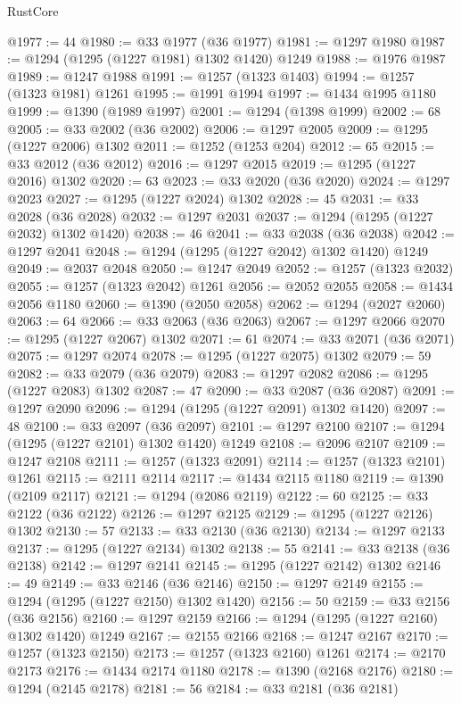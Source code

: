 \begin{lexlean}{RustCore}
\begin{coremodule}
@1977 := 44
@1980 := @33 @1977 (@36 @1977)
@1981 := @1297 @1980
@1987 := @1294 (@1295 (@1227 @1981) @1302 @1420) @1249
@1988 := @1976 @1987
@1989 := @1247 @1988
@1991 := @1257 (@1323 @1403)
@1994 := @1257 (@1323 @1981) @1261
@1995 := @1991 @1994
@1997 := @1434 @1995 @1180
@1999 := @1390 (@1989 @1997)
@2001 := @1294 (@1398 @1999)
@2002 := 68
@2005 := @33 @2002 (@36 @2002)
@2006 := @1297 @2005
@2009 := @1295 (@1227 @2006) @1302
@2011 := @1252 (@1253 @204)
@2012 := 65
@2015 := @33 @2012 (@36 @2012)
@2016 := @1297 @2015
@2019 := @1295 (@1227 @2016) @1302
@2020 := 63
@2023 := @33 @2020 (@36 @2020)
@2024 := @1297 @2023
@2027 := @1295 (@1227 @2024) @1302
@2028 := 45
@2031 := @33 @2028 (@36 @2028)
@2032 := @1297 @2031
@2037 := @1294 (@1295 (@1227 @2032) @1302 @1420)
@2038 := 46
@2041 := @33 @2038 (@36 @2038)
@2042 := @1297 @2041
@2048 := @1294 (@1295 (@1227 @2042) @1302 @1420) @1249
@2049 := @2037 @2048
@2050 := @1247 @2049
@2052 := @1257 (@1323 @2032)
@2055 := @1257 (@1323 @2042) @1261
@2056 := @2052 @2055
@2058 := @1434 @2056 @1180
@2060 := @1390 (@2050 @2058)
@2062 := @1294 (@2027 @2060)
@2063 := 64
@2066 := @33 @2063 (@36 @2063)
@2067 := @1297 @2066
@2070 := @1295 (@1227 @2067) @1302
@2071 := 61
@2074 := @33 @2071 (@36 @2071)
@2075 := @1297 @2074
@2078 := @1295 (@1227 @2075) @1302
@2079 := 59
@2082 := @33 @2079 (@36 @2079)
@2083 := @1297 @2082
@2086 := @1295 (@1227 @2083) @1302
@2087 := 47
@2090 := @33 @2087 (@36 @2087)
@2091 := @1297 @2090
@2096 := @1294 (@1295 (@1227 @2091) @1302 @1420)
@2097 := 48
@2100 := @33 @2097 (@36 @2097)
@2101 := @1297 @2100
@2107 := @1294 (@1295 (@1227 @2101) @1302 @1420) @1249
@2108 := @2096 @2107
@2109 := @1247 @2108
@2111 := @1257 (@1323 @2091)
@2114 := @1257 (@1323 @2101) @1261
@2115 := @2111 @2114
@2117 := @1434 @2115 @1180
@2119 := @1390 (@2109 @2117)
@2121 := @1294 (@2086 @2119)
@2122 := 60
@2125 := @33 @2122 (@36 @2122)
@2126 := @1297 @2125
@2129 := @1295 (@1227 @2126) @1302
@2130 := 57
@2133 := @33 @2130 (@36 @2130)
@2134 := @1297 @2133
@2137 := @1295 (@1227 @2134) @1302
@2138 := 55
@2141 := @33 @2138 (@36 @2138)
@2142 := @1297 @2141
@2145 := @1295 (@1227 @2142) @1302
@2146 := 49
@2149 := @33 @2146 (@36 @2146)
@2150 := @1297 @2149
@2155 := @1294 (@1295 (@1227 @2150) @1302 @1420)
@2156 := 50
@2159 := @33 @2156 (@36 @2156)
@2160 := @1297 @2159
@2166 := @1294 (@1295 (@1227 @2160) @1302 @1420) @1249
@2167 := @2155 @2166
@2168 := @1247 @2167
@2170 := @1257 (@1323 @2150)
@2173 := @1257 (@1323 @2160) @1261
@2174 := @2170 @2173
@2176 := @1434 @2174 @1180
@2178 := @1390 (@2168 @2176)
@2180 := @1294 (@2145 @2178)
@2181 := 56
@2184 := @33 @2181 (@36 @2181)

\end{coremodule}
\end{lexlean}
